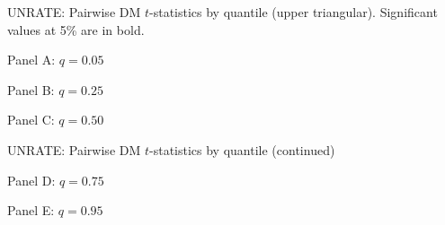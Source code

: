 \documentclass[12pt]{article}
\newcommand{\resultsdate}{2026-02-05}
\begin{document}
\begin{table}[H]
  \centering
  \caption{UNRATE: Pairwise DM $t$-statistics by quantile (upper triangular). Significant values at 5\% are in bold.}
  \label{tab: dm_quantile_unrate}

  \begin{subtable}{\textwidth}
    \centering
    \caption*{Panel A: $q=0.05$}
    \resizebox{\textwidth}{!}{
    
    }
  \end{subtable}

  \vspace{0.5em}
  \begin{subtable}{\textwidth}
    \centering
    \caption*{Panel B: $q=0.25$}
    \resizebox{\textwidth}{!}{
    
    }
  \end{subtable}

  \vspace{0.5em}
  \begin{subtable}{\textwidth}
    \centering
    \caption*{Panel C: $q=0.50$}
    \resizebox{\textwidth}{!}{
    
    }
  \end{subtable}

\end{table}

\begin{table}[H]
  \centering
  \caption*{UNRATE: Pairwise DM $t$-statistics by quantile (continued)}

  \begin{subtable}{\textwidth}
    \centering
    \caption*{Panel D: $q=0.75$}
    \resizebox{\textwidth}{!}{
    
    }
  \end{subtable}

  \vspace{0.5em}
  \begin{subtable}{\textwidth}
    \centering
    \caption*{Panel E: $q=0.95$}
    \resizebox{\textwidth}{!}{
    
    }
  \end{subtable}
\end{table}
\end{document}
